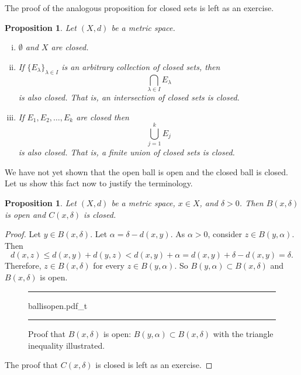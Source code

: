 \documentclass[12pt,openany]{book}
\theoremstyle{plain}
\newtheorem{prop}[thm]{Proposition}
\theoremstyle{remark}
\theoremstyle{definition}
\newenvironment{myfig}{%
\begin{figure}[h!t]
\noindent\rule{\textwidth}{0.4pt}\vspace{12pt}\par\centering}%
{\par\noindent\rule{\textwidth}{0.4pt}
\end{figure}}
\theoremstyle{exercise}
\theoremstyle{example}
\begin{document}
The proof of the analogous proposition for closed sets
is left as an exercise.

\pagebreak[2]

\begin{prop} \label{prop:topology:closed}
Let $(X,d)$ be a metric space.
\begin{enumerate}[(i)]
\item \label{topology:closedi} $\emptyset$ and $X$ are closed.
\item \label{topology:closedii} If $\{ E_\lambda \}_{\lambda \in I}$ is
an arbitrary collection of closed sets, then
\begin{equation*}
\bigcap_{\lambda \in I} E_\lambda
\end{equation*}
is also closed.  That is, an intersection of closed sets is closed.
\item \label{topology:closediii} If $E_1, E_2, \ldots, E_k$ are closed then
\begin{equation*}
\bigcup_{j=1}^k E_j
\end{equation*}
is also closed.  That is, a finite union of closed sets is closed.
\end{enumerate}
\end{prop}

We have not yet shown that the open ball is open and the closed ball is
closed.  Let us show this fact now to justify the terminology.

\begin{prop} \label{prop:topology:ballsopenclosed}
Let $(X,d)$ be a metric space, $x \in X$, and $\delta > 0$.  Then
$B(x,\delta)$ is open and 
$C(x,\delta)$ is closed.
\end{prop}

\begin{proof}
Let $y \in B(x,\delta)$.  Let $\alpha = \delta-d(x,y)$.  As $\alpha
> 0$, consider $z \in B(y,\alpha)$.  Then
\begin{equation*}
d(x,z) \leq d(x,y) + d(y,z) < d(x,y) + \alpha = d(x,y) + \delta-d(x,y) =
\delta .
\end{equation*}
Therefore, $z \in B(x,\delta)$ for every $z \in B(y,\alpha)$.  So $B(y,\alpha) \subset B(x,\delta)$ and
$B(x,\delta)$ is open.

\begin{myfig}
{ballisopen.pdf_t}
\caption{Proof that $B(x,\delta)$ is open: $B(y,\alpha) \subset
B(x,\delta)$ with the triangle inequality illustrated.\label{fig:ballisopen}}
\end{myfig}

The proof that $C(x,\delta)$ is closed is left as an exercise.
\end{proof}
\end{document}
